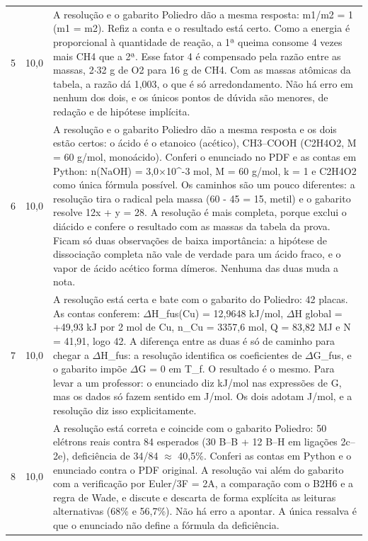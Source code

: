 \documentclass{article}%
\begin{document}
\begin{longtable}{@{}c c p{}@{}}
5 & 10,0 & A resolução e o gabarito Poliedro dão a mesma resposta: m1/m2 = 1 (m1 = m2). Refiz a conta e o resultado está certo. Como a energia é proporcional à quantidade de reação, a 1ª queima consome 4 vezes mais CH4 que a 2ª. Esse fator 4 é compensado pela razão entre as massas, 2$\cdot$32 g de O2 para 16 g de CH4. Com as massas atômicas da tabela, a razão dá 1,003, o que é só arredondamento. Não há erro em nenhum dos dois, e os únicos pontos de dúvida são menores, de redação e de hipótese implícita. \\
6 & 10,0 & A resolução e o gabarito Poliedro dão a mesma resposta e os dois estão certos: o ácido é o etanoico (acético), CH3--COOH (C2H4O2, M = 60 g/mol, monoácido). Conferi o enunciado no PDF e as contas em Python: n(NaOH) = 3,0$\times$10\^{}{-}3 mol, M = 60 g/mol, k = 1 e C2H4O2 como única fórmula possível. Os caminhos são um pouco diferentes: a resolução tira o radical pela massa (60 - 45 = 15, metil) e o gabarito resolve 12x + y = 28. A resolução é mais completa, porque exclui o diácido e confere o resultado com as massas da tabela da prova. Ficam só duas observações de baixa importância: a hipótese de dissociação completa não vale de verdade para um ácido fraco, e o vapor de ácido acético forma dímeros. Nenhuma das duas muda a nota. \\
7 & 10,0 & A resolução está certa e bate com o gabarito do Poliedro: 42 placas. As contas conferem: $\Delta$H\_fus(Cu) = 12,9648 kJ/mol, $\Delta$H global = +49,93 kJ por 2 mol de Cu, n\_Cu = 3357,6 mol, Q = 83,82 MJ e N = 41,91, logo 42. A diferença entre as duas é só de caminho para chegar a $\Delta$H\_fus: a resolução identifica os coeficientes de $\Delta$G\_fus, e o gabarito impõe $\Delta$G = 0 em T\_f. O resultado é o mesmo. Para levar a um professor: o enunciado diz kJ/mol nas expressões de G, mas os dados só fazem sentido em J/mol. Os dois adotam J/mol, e a resolução diz isso explicitamente. \\
8 & 10,0 & A resolução está correta e coincide com o gabarito Poliedro: 50 elétrons reais contra 84 esperados (30 B--B + 12 B--H em ligações 2c--2e), deficiência de 34/84 $\approx$ 40,5\%. Conferi as contas em Python e o enunciado contra o PDF original. A resolução vai além do gabarito com a verificação por Euler/3F = 2A, a comparação com o B2H6 e a regra de Wade, e discute e descarta de forma explícita as leituras alternativas (68\% e 56,7\%). Não há erro a apontar. A única ressalva é que o enunciado não define a fórmula da deficiência. \\

\end{longtable}
\end{document}
